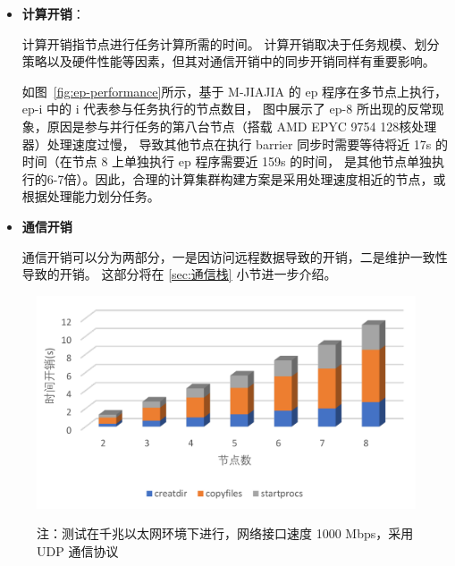 {\begin{itemize}
              系统初始化开销代表调用 jia\_init() 初始化 M-JIAJIA 系统所耗费的时间。

              程序分发与远程执行产生的通信开销是系统初始化过程中最主要的性能瓶颈。
              当前，M-JIAJIA采用基于SCP（Secure Copy）的程序分发和SSH（Secure Shell）远程执行机制，
              其单线程串行传输模式导致分发时间随集群规模扩大呈线性增长（如图~\ref{fig:time-create-procs}所示）。
              这种设计并不高效，未来可以通过并行分发策略和采用 RDMA 拷贝协议来降低该部分的开销。

              另一部分系统初始化开销是RDMA通信栈的初始化，这部分的开销如图~\ref{fig:time-init-rdma-comm}所示。
              目前已有研究~\citep{guo2024secm}尝试在建连阶段以流水线方式同时执行多个连接设置以降低该部分的开销。

        \item \textbf{计算开销}：

              计算开销指节点进行任务计算所需的时间。
              计算开销取决于任务规模、划分策略以及硬件性能等因素，但其对通信开销中的同步开销同样有重要影响。

              如图~\ref{fig:ep-performance}所示，基于 M-JIAJIA 的 ep 程序在多节点上执行，ep-i 中的 i 代表参与任务执行的节点数目，
              图中展示了 ep-8 所出现的反常现象，原因是参与并行任务的第八台节点（搭载 AMD EPYC 9754 128核处理器）处理速度过慢，
              导致其他节点在执行 barrier 同步时需要等待将近 17s 的时间（在节点 8 上单独执行 ep 程序需要近 159s 的时间，
              是其他节点单独执行的6-7倍）。因此，合理的计算集群构建方案是采用处理速度相近的节点，或根据处理能力划分任务。

        \item \textbf{通信开销}

              通信开销可以分为两部分，一是因访问远程数据导致的开销，二是维护一致性导致的开销。
              这部分将在 \ref{sec:通信栈} 小节进一步介绍。

    \end{itemize}

    \begin{figure}
        \centering
        \includegraphics[width=0.85\linewidth]{Img/程序不同集群规模开销.pdf}
        \label{fig:time-create-procs}
        {\footnotesize \par 注：测试在千兆以太网环境下进行，网络接口速度 1000 Mbps，采用 UDP 通信协议}
    \end{figure}

}
